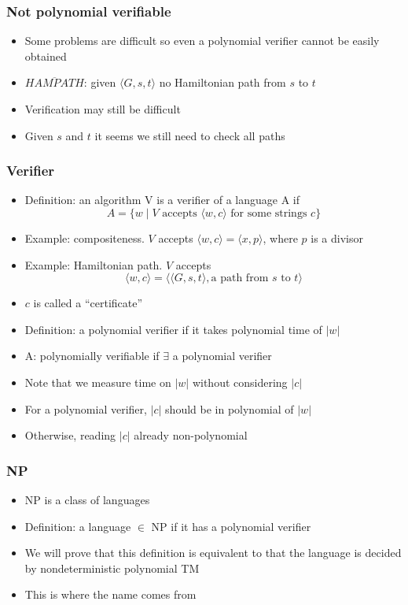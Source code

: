 \begin{frame}[allowframebreaks] \frametitle{Not polynomial verifiable}
  \begin{itemize}
  \item Some problems are difficult so even a polynomial verifier cannot
    be easily obtained
\item $\overline{HAMPATH}$: given $\langle  G,s,t\rangle$ no Hamiltonian
path from $s$ to $t$

\item Verification may still be difficult
\item Given $s$ and $t$ it seems we 
still need to check all paths

\end{itemize}\end{frame} \begin{frame}[allowframebreaks] \frametitle{Verifier}
  \begin{itemize}
\item Definition: an algorithm V is a verifier of a language A if
  \begin{equation*}
    A=\{w\mid
V \mbox{ accepts } 
\langle  w,c\rangle  
\mbox{ for some strings } c\}
  \end{equation*}
\item Example: compositeness. $V$ accepts $\langle  w,c\rangle  = \langle  x,p\rangle $, where $p$ is a divisor
\item Example: Hamiltonian path. $V$ accepts
  \begin{equation*}
  \langle  w,c\rangle  = \langle  \langle  G,s,t\rangle , \mbox{a path from $s$ to $t$}\rangle 
\end{equation*}
\item $c$ is called a  ``certificate''
\item Definition: a polynomial verifier if it takes polynomial time of $|w|$
\item A: polynomially verifiable if 
  $\exists$ a polynomial verifier
\item Note that we measure time on $|w|$ without considering $|c|$

\item For a polynomial verifier,  $|c|$ should be in polynomial of $|w|$

\item [] Otherwise, reading $|c|$ already non-polynomial
\end{itemize}\end{frame} \begin{frame}[allowframebreaks] \frametitle{NP}
  \begin{itemize}
\item NP is a class of languages 
\item Definition: a language $\in$ NP if it has a polynomial verifier
\item We will prove that this definition is equivalent to that the language
  is decided by nondeterministic polynomial TM 
\item This is where the name comes from


\end{itemize}
\end{frame}
